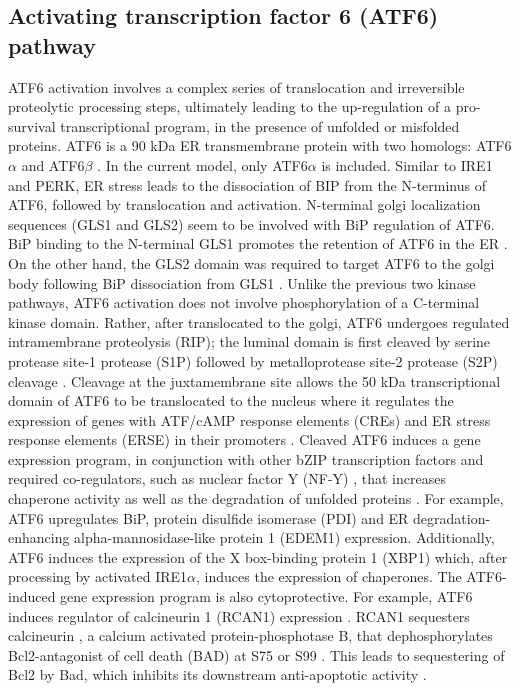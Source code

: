 \documentclass[fleqn,10pt]{wlscirep}
\begin{document}
\subsection*{Activating transcription factor 6 (ATF6) pathway}
ATF6 activation involves a complex series of translocation and irreversible proteolytic processing steps, ultimately leading to the up-regulation of a pro-survival transcriptional program, in the presence of unfolded or misfolded proteins. ATF6 is a 90 kDa ER transmembrane protein with two homologs: ATF6$\alpha$ \cite{silver1999mtf,hai1989tfa} and ATF6$\beta$ \cite{min1995ncf,khanna1996ggc,kyosuke2001igc}. In the current model, only ATF6$\alpha$ is included. Similar to IRE1 and PERK, ER stress leads to the dissociation of BIP from the N-terminus of ATF6, followed by translocation and activation. N-terminal golgi localization sequences (GLS1 and GLS2) seem to be involved with BiP regulation of ATF6. BiP binding to the N-terminal GLS1 promotes the retention of ATF6 in the ER \cite{shen2002esr}. On the other hand, the GLS2 domain was required to target ATF6 to the golgi body following BiP dissociation from GLS1 \cite{shen2002esr}. Unlike the previous two kinase pathways, ATF6 activation does not involve phosphorylation of a C-terminal kinase domain. Rather, after translocated to the golgi, ATF6 undergoes regulated intramembrane proteolysis (RIP); the luminal domain is first cleaved by serine protease site-1 protease (S1P) followed by metalloprotease site-2 protease (S2P) cleavage \cite{silver1999mtf,ye2000esi,chen2002lda,shen2004dsp}. Cleavage at the juxtamembrane site allows the 50 kDa transcriptional domain of ATF6 to be translocated to the nucleus where it regulates the expression of genes with ATF/cAMP response elements (CREs) \cite{wang2000aaa} and  ER stress response elements (ERSE) in their promoters \cite{yoshida1998ica, kokame2001iei}. Cleaved ATF6 induces a gene expression program, in conjunction with other bZIP transcription factors and required co-regulators, such as nuclear factor Y (NF-Y) \cite{kokame2001iei,yoshida2000aap}, that increases chaperone activity as well as the degradation of unfolded proteins \cite{yamamoto2007tim,wu2007aol}. For example, ATF6 upregulates BiP, protein disulfide isomerase (PDI) and ER degradation-enhancing alpha-mannosidase-like protein 1 (EDEM1) expression. Additionally, ATF6 induces the expression of the X box-binding protein 1 (XBP1) which, after processing by activated IRE1$\alpha$, induces the expression of chaperones. The ATF6-induced gene expression program is also cytoprotective. For example, ATF6 induces regulator of calcineurin 1 (RCAN1) expression \cite{belmont2008cga}. RCAN1 sequesters calcineurin \cite{belmont2008cga}, a calcium activated protein-phosphotase B, that dephosphorylates Bcl2-antagonist of cell death (BAD) at S75 or S99 \cite{wang1999cia}. This leads to sequestering of Bcl2 by Bad, which inhibits its downstream anti-apoptotic activity \cite{wang1999cia}.
\end{document}
